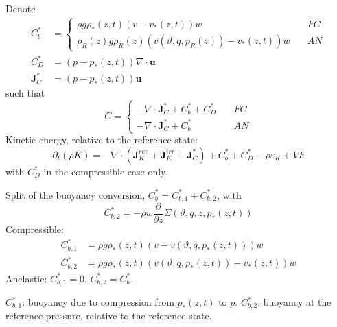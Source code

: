\documentclass{article}
\begin{document}
Denote
\begin{align}
    C_b^*
    & =
    \begin{cases}
        \rho g \rho_*(z, t) \left( v - v_*(z, t) \right) w
        \quad& FC
        \\
        \rho_R(z) g \rho_R(z) \left( v(\vartheta, q, p_R(z)) - v_*(z, t) \right) w
        \quad& AN
    \end{cases}
    \\
    C_D^*
    & =
    (p - p_*(z, t)) \nabla \cdot \mathbf{u}
    \\
    \mathbf{J}_C^*
    & =
    (p - p_*(z, t)) \mathbf{u}
\end{align}
such that
\begin{equation}
    C =
    \begin{cases}
    - \nabla\cdot \mathbf{J}_C^* + C_b^* + C_D^*
    \quad & FC
    \\
    - \nabla\cdot \mathbf{J}_C^* + C_b^*
    \quad & AN
    \end{cases}
\end{equation}
Kinetic energy, relative to the reference state:
\begin{equation}
    \partial _t (\rho K)
    =
    - \nabla\cdot (
        \mathbf{J}_K^{rev}
        + \mathbf{J}_K^{irr}
        + \mathbf{J}_C^*
        )
    + C_b^* + C_D^*
    - \rho \varepsilon_K
    + VF
\end{equation}
with \(C_D^*\) in the compressible case only.

Split of the buoyancy conversion, \(C_b^* = C_{b,1}^* + C_{b,2}^*\), with
\begin{equation}
    C_{b,2}^*
    =
    - \rho w
    \frac{\partial}{\partial z}
    \Sigma(\vartheta, q, z, p_*(z, t))
\end{equation}
Compressible:
\begin{align}
    C_{b,1}^*
    & =
    \rho g \rho_*(z, t) \left( v - v(\vartheta, q, p_*(z, t)) \right) w
    \\
    C_{b,2}^*
    & =
    \rho g \rho_*(z, t) \left( v(\vartheta, q, p_*(z, t)) - v_*(z, t) \right) w
\end{align}
Anelastic: \(C_{b,1}^* = 0\), \(C_{b,2}^* = C_b^*\).

\(C_{b,1}^*\): buoyancy due to compression from \(p_*(z, t)\) to \(p\). \(C_{b,2}^*\): buoyancy at the reference pressure, relative to the reference state.
\end{document}
